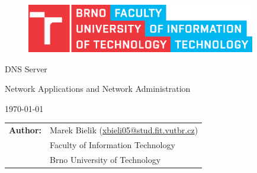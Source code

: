 \begin{titlepage}

\vspace*{2cm}
\begin{figure}[!h]
  \centering
  \includegraphics[width=10cm]{img/FIT_color_CMYK_EN.eps}
\end{figure}

\vfill

\begin{center}

\begin{Huge}
	DNS Server
\end{Huge}

\bigskip

\begin{Large}
	Network Applications and Network Administration
\end{Large}

\bigskip
\end{center}

\vfill

\begin{center}
\begin{Large}
\today
\end{Large}
\end{center}

\vfill

\begin{flushleft}
\begin{normalsize}
\begin{tabular}{ll}
\bf Author:\hspace{3mm} & Marek Bielik (\url{xbieli05@stud.fit.vutbr.cz}) \\[3mm]

& Faculty of Information Technology \\
& Brno University of Technology
\end{tabular}
\end{normalsize}
\end{flushleft}
\end{titlepage}
